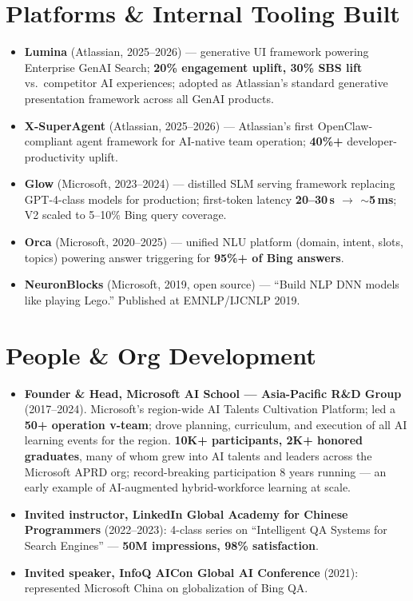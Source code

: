 \documentclass[10.5pt,letterpaper]{article}
\begin{document}
\section*{Platforms \& Internal Tooling Built}
\begin{itemize}
  \item \textbf{Lumina} (Atlassian, 2025--2026) --- generative UI framework powering Enterprise GenAI Search; \textbf{20\% engagement uplift, 30\% SBS lift} vs.\ competitor AI experiences; adopted as Atlassian's standard generative presentation framework across all GenAI products.
  \item \textbf{X-SuperAgent} (Atlassian, 2025--2026) --- Atlassian's first OpenClaw-compliant agent framework for AI-native team operation; \textbf{40\%+} developer-productivity uplift.
  \item \textbf{Glow} (Microsoft, 2023--2024) --- distilled SLM serving framework replacing GPT-4-class models for production; first-token latency \textbf{20--30\,s $\to$ $\sim$5\,ms}; V2 scaled to 5--10\% Bing query coverage.
  \item \textbf{Orca} (Microsoft, 2020--2025) --- unified NLU platform (domain, intent, slots, topics) powering answer triggering for \textbf{95\%+ of Bing answers}.
  \item \textbf{NeuronBlocks} (Microsoft, 2019, open source) --- ``Build NLP DNN models like playing Lego.'' Published at EMNLP/IJCNLP 2019.
\end{itemize}

\section*{People \& Org Development}
\begin{itemize}
  \item \textbf{Founder \& Head, Microsoft AI School --- Asia-Pacific R\&D Group} (2017--2024). Microsoft's region-wide AI Talents Cultivation Platform; led a \textbf{50+ operation v-team}; drove planning, curriculum, and execution of all AI learning events for the region. \textbf{10K+ participants, 2K+ honored graduates}, many of whom grew into AI talents and leaders across the Microsoft APRD org; record-breaking participation 8 years running --- an early example of AI-augmented hybrid-workforce learning at scale.
  \item \textbf{Invited instructor, LinkedIn Global Academy for Chinese Programmers} (2022--2023): 4-class series on ``Intelligent QA Systems for Search Engines'' --- \textbf{50M impressions, 98\% satisfaction}.
  \item \textbf{Invited speaker, InfoQ AICon Global AI Conference} (2021): represented Microsoft China on globalization of Bing QA.
\end{itemize}
\end{document}
